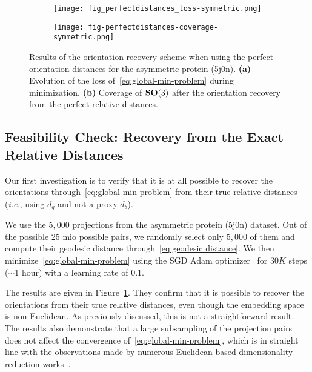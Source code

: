 \begin{figure}[t]
    \centering
    \begin{subfigure}[b]{0.48\textwidth}
        \texttt{[image: fig\_perfectdistances\_loss-symmetric.png]}
        \caption{} 
    \end{subfigure} \quad 
    \begin{subfigure}[b]{0.48\textwidth}
    \centering 
        \texttt{[image: fig-perfectdistances-coverage-symmetric.png]}
        \caption{} 
    \end{subfigure}
    \caption{Results of the orientation recovery scheme when using the perfect orientation distances for the asymmetric protein (5j0n). \textbf{(a)} Evolution of the loss of~\eqref{eq:global-min-problem} during minimization. \textbf{(b)} Coverage of $\mathrm{\mathbf{SO}}(3)$ after the orientation recovery from the perfect relative distances. } 
    \label{fig:minim-loss-perfect-distances}
\end{figure}

\subsection{Feasibility Check: Recovery from the Exact Relative Distances}
\label{subsec:5-6-3-sanity-check}

Our first investigation is to verify that it is at all possible to recover the orientations through~\eqref{eq:global-min-problem} from their true relative distances (\textit{i.e.}, using $d_q$ and not a proxy $d_b$). 

We use the $5,000$ projections from the asymmetric protein (5j0n) dataset. Out of the possible 25 mio possible pairs, we randomly select only $5,000$ of them and compute their geodesic distance through~\eqref{eq:geodesic distance}. We then minimize~\eqref{eq:global-min-problem} using the SGD Adam optimizer~\cite{kingma2014adam} for $30K$ steps ($\sim$1 hour) with a learning rate of $0.1$. 

The results are given in Figure~\ref{fig:minim-loss-perfect-distances}. They confirm that it is possible to recover the orientations from their true relative distances, even though the embedding space is non-Euclidean. As previously discussed, this is not a straightforward result. The results also demonstrate that a large subsampling of the projection pairs does not affect the convergence of~\eqref{eq:global-min-problem}, which is in straight line with the observations made by numerous Euclidean-based dimensionality reduction works~\cite{belkin2003laplacian,kruskal1978multidimensional, maaten2008visualizing, mcinnes2018umap}. 

